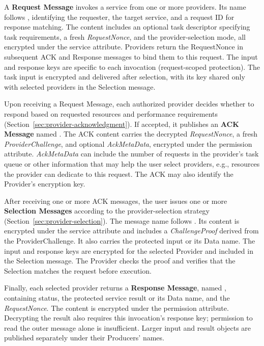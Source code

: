 A \textbf{Request Message} invokes a service from one or more providers. Its name follows , identifying the requester, the target service, and a request ID for response matching. The content includes an optional task descriptor specifying task requirements, a fresh \emph{RequestNonce}, and the provider-selection mode, all encrypted under the service attribute. Providers return the RequestNonce in subsequent ACK and Response messages to bind them to this request. The input and response keys are specific to each invocation (request-scoped protection). The task input is encrypted and delivered after selection, with its key shared only with selected providers in the Selection message.

Upon receiving a Request Message, each authorized provider decides whether to respond based on requested resources and performance requirements (Section~\ref{sec:provider-acknowledgment}). If accepted, it publishes an \textbf{ACK Message} named . The ACK content carries the decrypted \emph{RequestNonce}, a fresh \emph{ProviderChallenge}, and optional \emph{AckMetaData}, encrypted under the permission attribute. \emph{AckMetaData} can include the number of requests in the provider's task queue or other information that may help the user select providers, e.g., resources the provider can dedicate to this request. The ACK may also identify the Provider's encryption key.

After receiving one or more ACK messages, the user issues one or more \textbf{Selection Messages} according to the provider-selection strategy (Section~\ref{sec:provider-selection}). The message name follows . Its content is encrypted under the service attribute and includes a \emph{ChallengeProof} derived from the ProviderChallenge. It also carries the protected input or its Data name. The input and response keys are encrypted for the selected Provider and included in the Selection message. The Provider checks the proof and verifies that the Selection matches the request before execution.

Finally, each selected provider returns a \textbf{Response Message}, named , containing status, the protected service result or its Data name, and the \emph{RequestNonce}. The content is encrypted under the permission attribute. Decrypting the result also requires this invocation's response key; permission to read the outer message alone is insufficient. Larger input and result objects are published separately under their Producers' names.

